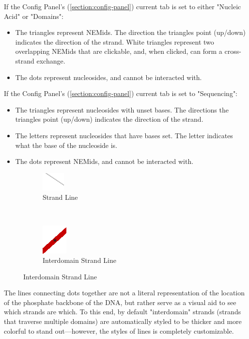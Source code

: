 \documentclass[titlepage]{article}
\begin{document}
	If the Config Panel's (\ref{section:config-panel}) current tab is set to either "Nucleic Acid" or "Domains":
	\begin{itemize}
		\item The triangles represent NEMids. The direction the triangles point (up/down) indicates the direction of the strand. White triangles represent two overlapping NEMids that are clickable, and, when clicked, can form a cross-strand exchange.
		\item The dots represent nucleosides, and cannot be interacted with.
	\end{itemize}

	If the Config Panel's (\ref{section:config-panel}) current tab is set to "Sequencing":
	\begin{itemize}
		\item The triangles represent nucleosides with unset bases. The directions the triangles point (up/down) indicates the direction of the strand.
		\item The letters represent nucleosides that have bases set. The letter indicates what the base of the nucleoside is. 
		\item The dots represent NEMids, and cannot be interacted with.
	\end{itemize}

	\begin{figure}[h]
		\centering
		\caption{Side View Plot Line Graphics}
		\label{fig:side-view-plot-line-graphics}
		
		\begin{subfigure}{.4\linewidth}
			\centering
			\includegraphics[width=.3in]{strand-line.png}
			\caption{Strand Line}
			\label{fig:strand-line}
		\end{subfigure}%
		~
		\begin{subfigure}{.3\linewidth}
			\centering
			\includegraphics[width=.3in]{interdomain-strand-line.png}
			\caption{Interdomain Strand Line}
			\label{fig:interdomain-strand-line}
		\end{subfigure}
	\end{figure}

	The lines connecting dots together are not a literal representation of the location of the phosphate backbone of the DNA, but rather serve as a visual aid to see which strands are which. To this end, by default "interdomain" strands (strands that traverse multiple domains) are automatically styled to be thicker and more colorful to stand out—however, the styles of lines is completely customizable.
	
\end{document}
